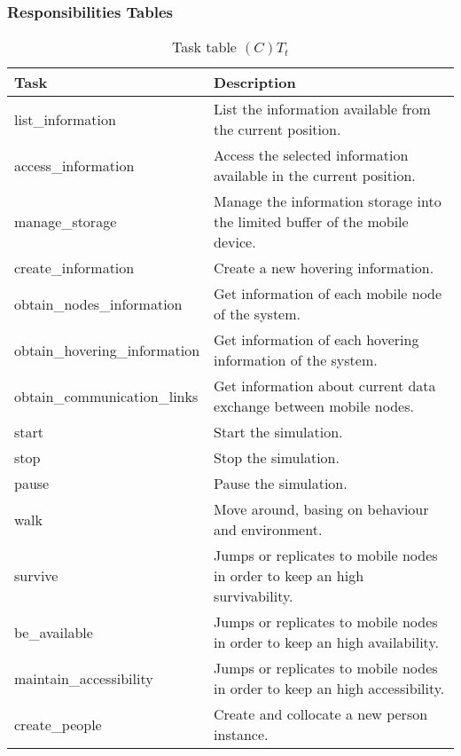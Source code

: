 \subsubsection*{Responsibilities Tables}

\begin{table}[H]
	\centering
	\begin{tabular}{|p{5cm}|p{7cm}|}
			\hline
			\textbf{Task} & \textbf{Description} \\
			\hline
			list\_information & List the information available from the current
			position.\\
			\hline
			access\_information & Access the selected information available in the
			current position.\\
			\hline
			manage\_storage & Manage the information storage into the limited buffer
			of the mobile device. \\
			\hline
			create\_information & Create a new hovering information. \\
			\hline
			obtain\_nodes\_information & Get information of each mobile node of the
			system.\\
			\hline
			obtain\_hovering\_information & Get information of each hovering
			information of the system. \\
			\hline
			obtain\_communication\_links & Get information about current data exchange
			between mobile nodes. \\
			\hline
			start & Start the simulation. \\
			\hline
			stop & Stop the simulation. \\
			\hline
			pause & Pause the simulation. \\
			\hline
			walk & Move around, basing on behaviour and environment. \\
			\hline
			survive & Jumps or replicates to mobile nodes in order to keep an high
			survivability. \\
			\hline
			be\_available & Jumps or replicates to mobile nodes in order to keep an
			high availability. \\
			\hline
			maintain\_accessibility & Jumps or replicates to mobile nodes in order to
			keep an high accessibility. \\
			\hline
			create\_people & Create and collocate a new person instance. \\
			\hline
		\end{tabular}
	\caption{Task table $(C)T_t$}
	\label{tab:ctt}
\end{table}

